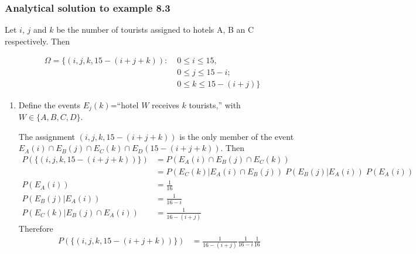 \begin{frame}
    \frametitle{Analytical solution to example 8.3}

    \tiny
    Let $i$, $j$ and $k$ be the number of tourists assigned to hotels A, B an C
    respectively. Then 

    \begin{align*}
        \Omega=\{(i,j,k,15-(i+j+k)):\;&0\le i\le 15,\\
                                      &0\le j\le 15-i;\\
                                      &0\le k\le 15-(i+j)\}
    \end{align*}

    \begin{enumerate}[a]

		\item Define the events $E_j(k)$=``hotel $W$ receives $k$ tourists,''
with $W\in\{A,B,C,D\}$.

			The assignment $(i,j,k,15-(i+j+k))$ is the only member of the
            event $E_A(i)\cap E_B(j)\cap E_C(k)\cap E_D(15-(i+j+k))$. Then
            \begin{align*}
                P(\{(i,j,k,15-(i+j+k))\})&=P(E_A(i)\cap E_B(j)\cap E_C(k))\\
                                         &=P(E_C(k)|E_A(i)\cap
                                         E_B(j))\;P(E_B(j)|E_A(i))\;P(E_A(i))\\
                P(E_A(i))&=\frac{1}{16}\\
                P(E_B(j)|E_A(i))&=\frac{1}{16-i}\\
                P(E_C(k)|E_B(j)\cap E_A(i))&=\frac{1}{16-(i+j)}
            \end{align*}
            Therefore
            \begin{align*}
                P(\{(i,j,k,15-(i+j+k))\})&=\frac{1}{16-(i+j)}\frac{1}{16-i}\frac{1}{16}
            \end{align*}
		\seti
    \end{enumerate}
    \normalsize

\end{frame}

